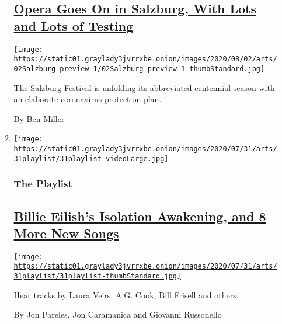 \begin{enumerate}
\begin{enumerate}
    \hypertarget{opera-goes-on-in-salzburg-with-lots-and-lots-of-testing}{%
    \subsection{\texorpdfstring{\href{/2020/07/31/arts/music/salzburg-festival-coronavirus-cosi.html}{Opera
    Goes On in Salzburg, With Lots and Lots of
    Testing}}{Opera Goes On in Salzburg, With Lots and Lots of Testing}}\label{opera-goes-on-in-salzburg-with-lots-and-lots-of-testing}}

    \href{/2020/07/31/arts/music/salzburg-festival-coronavirus-cosi.html}{\texttt{[image: https://static01.graylady3jvrrxbe.onion/images/2020/08/02/arts/02Salzburg-preview-1/02Salzburg-preview-1-thumbStandard.jpg]}}

    The Salzburg Festival is unfolding its abbreviated centennial season
    with an elaborate coronavirus protection plan.

    By Ben Miller
  \item
    \texttt{[image: https://static01.graylady3jvrrxbe.onion/images/2020/07/31/arts/31playlist/31playlist-videoLarge.jpg]}

    \hypertarget{the-playlist}{%
    \subsubsection{The Playlist}\label{the-playlist}}

    \hypertarget{billie-eilishs-isolation-awakening-and-8-more-new-songs}{%
    \subsection{\texorpdfstring{\href{/2020/07/31/arts/music/playlist-billie-eilish-snakehips-a-boogie.html}{Billie
    Eilish's Isolation Awakening, and 8 More New
    Songs}}{Billie Eilish's Isolation Awakening, and 8 More New Songs}}\label{billie-eilishs-isolation-awakening-and-8-more-new-songs}}

    \href{/2020/07/31/arts/music/playlist-billie-eilish-snakehips-a-boogie.html}{\texttt{[image: https://static01.graylady3jvrrxbe.onion/images/2020/07/31/arts/31playlist/31playlist-thumbStandard.jpg]}}

    Hear tracks by Laura Veirs, A.G. Cook, Bill Frisell and others.

    By Jon Pareles, Jon Caramanica and Giovanni Russonello
  \end{enumerate}
\end{enumerate}

